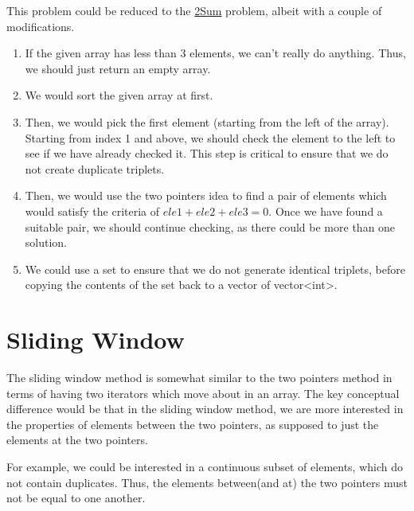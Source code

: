 \documentclass[11pt]{article}
\begin{document}
This problem could be reduced to the \href{https://leetcode.com/problems/two-sum/}{2Sum}
problem, albeit with a couple of modifications.
\begin{enumerate}
 \item{
             If the given array has less than 3 elements, we can't really do anything. Thus, we should just return an empty array.
             
       }
 \item{
             We would sort the given array at first.
       }
 \item{
             Then, we would pick the first element (starting from the left of the array).
             Starting from index 1 and above, we should check the element to the left to see if we have already checked it. This step is critical to ensure that we do not create duplicate triplets.
       }
 \item {
       Then, we would use the two pointers idea to find a pair of elements which would satisfy the criteria of $ele1+ele2+ele3=0$. Once we have found a suitable pair, we should continue checking, as there could be more than one solution.
       
       }
       \item{
                   We could use a set to ensure that we do not generate identical triplets, before copying the contents of the set back to a vector of vector<int>.
             }
\end{enumerate}

\section{Sliding Window}
The sliding window method is somewhat similar to the two pointers method in terms of having two iterators which move about in an array. The key conceptual difference would be that in the sliding window method, we are more interested in the properties of elements between the two pointers, as supposed to just the elements at the two pointers.

For example, we could be interested in a continuous subset of elements, which do not contain duplicates. Thus, the elements between(and at) the two pointers must not be equal to one another. 
\end{document}
